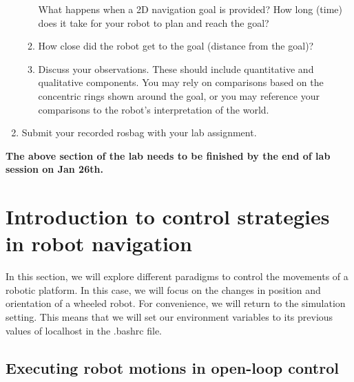\documentclass[12pt]{article}
\begin{document}
\begin{enumerate}
\begin{enumerate}
        What happens when a 2D navigation goal is provided? How long (time) does it take for your robot to plan and reach the goal? 
        \item How close did the robot get to the goal (distance from the goal)?
        \item Discuss your observations. These should include quantitative and qualitative components. You may rely on comparisons based on the concentric rings shown around the goal, or you may reference your comparisons to the robot’s interpretation of the world.
    \end{enumerate}
    \item Submit your recorded rosbag with your lab assignment.
    
    
\end{enumerate}

\textbf{The above section of the lab needs to be finished by the end of lab session on Jan 26th.} 


\section{Introduction to control strategies in robot navigation
}
In this section, we will explore different paradigms to control the movements of a robotic platform. In this case, we will focus on the changes in position and orientation of a wheeled robot. For convenience, we will return to the simulation setting.
This means that we will set our environment variables to its previous values of localhost in the .bashrc file. 

\subsection{Executing robot motions in open-loop control}
\end{document}
